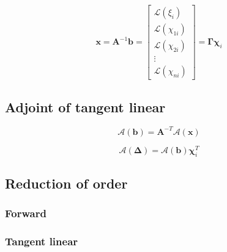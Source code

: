 \begin{equation}
\mathbf{x} =
\mathbf{A}^{-1}\mathbf{b} =
\left[
\begin{array}{ccccc}
\mathcal{L}(\xi_{i})   \\
\mathcal{L}(\chi_{1i}) \\
\mathcal{L}(\chi_{2i}) \\
\vdots \\
\mathcal{L}(\chi_{ni})
\end{array}
\right] = \mathbf{\Gamma} \boldsymbol{\chi}_{i}
\label{eq:eigen_problem-tangent_linear-x}
\end{equation}


%
\subsection{Adjoint of tangent linear}
\label{sec:eigen_problem-adjoint_of_tangent_linear}

\begin{equation}
\mathcal{A}(\mathbf{b}) = \mathbf{A}^{-T}\mathcal{A}(\mathbf{x})
\label{eq:eigen_problem-adjoint_of_tangent_linear-b_a}
\end{equation}

\begin{equation}
\mathcal{A}(\boldsymbol{\Delta}) = \mathcal{A}(\mathbf{b})\boldsymbol{\chi}^{T}_{i}
\label{eq:eigen_problem-adjoint_of_tangent_linear-delta_a}
\end{equation}


%
\subsection{Reduction of order}
\label{sec:eigen_problem-reduction_of_order}


\subsubsection{Forward}
\label{sec:eigen_problem-reduction_of_order-forward}


%
\subsubsection{Tangent linear}
\label{sec:eigen_problem-reduction_of_order-tangent_linear}


